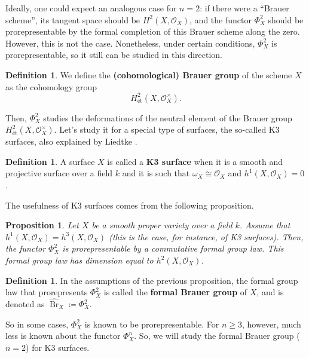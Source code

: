 \documentclass{report}
\DeclareMathOperator{\Br}{Br}
\newtheorem{proposition}[theorem]{Proposition}
\theoremstyle{definition}
\newtheorem{definition}[theorem]{Definition}
\begin{document}
Ideally, one could expect an analogous case for $n=2$: if there were a ``Brauer scheme'', its tangent space should be $H^2(X,\mathcal{O}_X)$, and the functor $\Phi_X^2$ should be prorepresentable by the formal completion of this Brauer scheme along the zero. However, this is not the case. Nonetheless, under certain conditions, $\Phi_X^2$ is prorepresentable, so it still can be studied in this direction.

\begin{definition}
We define the \textbf{(cohomological) Brauer group} of the scheme $X$ as the cohomology group
\[H_{\text{\'{e}t}}^2(X,\mathcal{O}_X^{\times}).\]
\end{definition}

Then, $\Phi_X^2$ studies the deformations of the neutral element of the Brauer group $H_{\text{\'{e}t}}^2(X,\mathcal{O}_X^{\times})$. Let's study it for a special type of surfaces, the so-called K3 surfaces, also explained by Liedtke \cite[Section~2]{liedtke2016lectures}.

\begin{definition}
A surface $X$ is called a \textbf{K3 surface} when it is a smooth and projective surface over a field $k$ and it is such that $\omega_X\cong\mathcal{O}_X$ and $h^1(X,\mathcal{O}_X)=0$.
\end{definition}

The usefulness of K3 surfaces comes from the following proposition.

\begin{proposition}
Let $X$ be a smooth proper variety over a field $k$. Assume that $h^1(X,\mathcal{O}_X)=h^3(X,\mathcal{O}_X)$ (this is the case, for instance, of K3 surfaces). Then, the functor $\Phi_X^2$ is prorepresentable by a commutative formal group law. This formal group law has dimension equal to $h^2(X,\mathcal{O}_X)$.
\end{proposition}

\begin{definition}
In the assumptions of the previous proposition, the formal group law that prorepresents $\Phi_X^2$ is called the \textbf{formal Brauer group} of $X$, and is denoted as $\widehat{\Br}_X\coloneqq\Phi_X^2$.
\end{definition}

So in some cases, $\Phi_X^2$ is known to be prorepresentable. For $n\geq3$, however, much less is known about the functor $\Phi_X^n$. So, we will study the formal Brauer group ($n=2$) for K3 surfaces.
\end{document}
